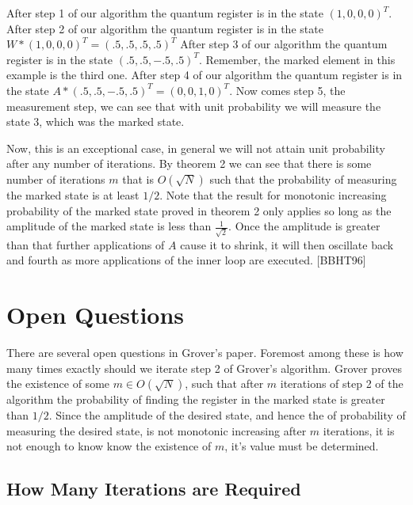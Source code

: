 \documentclass[]{article}
\begin{document}
After step 1 of our algorithm the quantum register is in the state
$(1,0,0,0)^{T}$.\newline 
After step 2 of our algorithm the quantum register is in the state
$W*(1,0,0,0)^{T} = (.5,.5,.5,.5)^{T}$\newline
After step 3 of our algorithm the quantum register is in the state
$(.5,.5,-.5,.5)^{T}$.  Remember, the marked element in this example is
the third one.\newline
After step 4 of our algorithm the quantum register is in the state
$A*(.5,.5,-.5,.5)^{T} = (0,0,1,0)^{T}$.\newline
Now comes step 5, the measurement step, we can see that with unit
probability we will measure the state 3, which was the marked
state.\newline

Now, this is an exceptional case, in general we will not attain unit
probability after any number of iterations.  By theorem 2 we can see
that there is some number of iterations $m$ that is $O(\sqrt{N})$ such
that the probability of measuring the marked state is at least $1/2$.
Note that the result for monotonic increasing probability of the
marked state proved in theorem 2 only applies so long as the amplitude
of the marked state is less than $\frac{1}{\sqrt{2}}$.  Once the
amplitude is greater than that further applications of $A$ cause it to
shrink, it will then oscillate back and fourth as more applications of
the inner loop are executed. [BBHT96]

\section{Open Questions}

There are several open questions in Grover's paper.  Foremost among
these is how many times exactly should we iterate step 2 of Grover's
algorithm.  Grover proves the existence of some $m \in O(\sqrt{N})$,
such that after $m$ iterations of step 2 of the algorithm the
probability of finding the register in the marked state is greater
than $1/2$.  Since the amplitude of the desired state, and hence the
of probability of measuring the desired state, is not monotonic
increasing after $m$ iterations, it is not enough to know know the
existence of $m$, it's value must be determined.

\subsection{How Many Iterations are Required}
\end{document}
